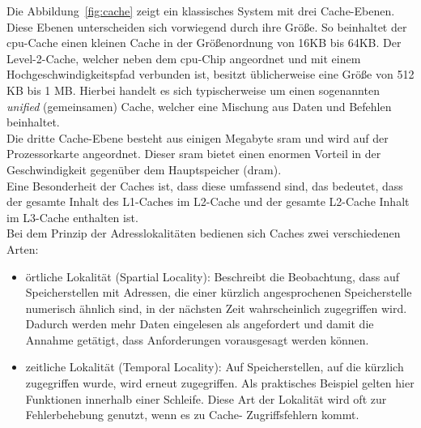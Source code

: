 Die Abbildung~\ref{fig:cache} zeigt ein klassisches System mit drei Cache-Ebenen. Diese Ebenen unterscheiden sich vorwiegend durch ihre Größe. So beinhaltet der \ac{cpu}-Cache einen kleinen Cache
in der Größenordnung von 16KB bis 64KB. Der Level-2-Cache, welcher neben dem \ac{cpu}-Chip angeordnet und mit einem Hochgeschwindigkeitspfad verbunden ist, besitzt üblicherweise eine Größe von
 512 KB bis 1 MB. Hierbei handelt es sich typischerweise um einen sogenannten \emph{unified} (gemeinsamen) Cache, welcher eine Mischung aus Daten und Befehlen beinhaltet. \\
 Die dritte Cache-Ebene besteht aus einigen Megabyte \ac{sram} und wird auf der Prozessorkarte angeordnet. Dieser \ac{sram} bietet einen enormen Vorteil in der Geschwindigkeit gegenüber dem
 Hauptspeicher (\ac{dram}). \\
 Eine Besonderheit der Caches ist, dass diese umfassend sind, das bedeutet, dass der gesamte Inhalt des L1-Caches im L2-Cache und der gesamte L2-Cache Inhalt im L3-Cache  enthalten ist.\\
 \newpage
Bei dem Prinzip der Adresslokalitäten bedienen sich Caches zwei verschiedenen Arten:\\

\begin{itemize}
  \item örtliche Lokalität (Spartial Locality): Beschreibt die Beobachtung, dass auf Speicherstellen mit 	Adressen, die einer kürzlich angesprochenen Speicherstelle numerisch ähnlich sind, in der
   	nächsten Zeit wahrscheinlich zugegriffen wird. Dadurch werden mehr Daten eingelesen als 	angefordert und damit die Annahme getätigt, dass Anforderungen vorausgesagt werden 	können.
  \item zeitliche Lokalität (Temporal Locality): Auf Speicherstellen, auf die kürzlich zugegriffen wurde, 	wird erneut zugegriffen.  Als praktisches Beispiel gelten hier Funktionen innerhalb
        einer Schleife. Diese Art der Lokalität wird oft zur Fehlerbehebung genutzt,  wenn es zu Cache-	Zugriffsfehlern kommt.\\
\end{itemize}

